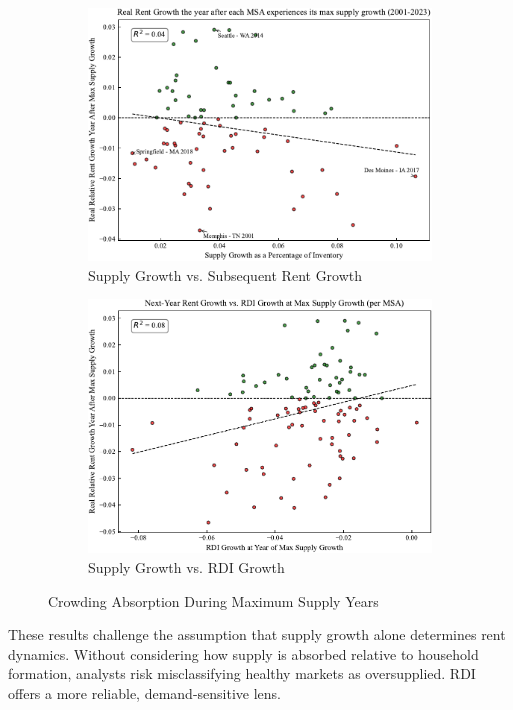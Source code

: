 \documentclass[APA,Times1COL]{WileyNJDv5} %
\begin{document}
\begin{figure}[h]
	\centering
\begin{subfigure}[b]{0.45\textwidth}
	\includegraphics[width=\textwidth]{max_supply_growth_vs_rent_growth.pdf}
	\caption{Supply Growth vs. Subsequent Rent Growth}
	\label{fig:supply-growth-rent}
\end{subfigure}
\hfill
\begin{subfigure}[b]{0.45\textwidth}
	\includegraphics[width=\textwidth]{max_supply_vs_RDI_growth.pdf}
	\caption{Supply Growth vs. RDI Growth}
	\label{fig:supply-growth-rdi}
\end{subfigure}
\caption{Crowding Absorption During Maximum Supply Years}
\label{fig:supply-rent}
\end{figure}
These results challenge the assumption that supply growth alone determines rent dynamics. Without considering how supply is absorbed relative to household formation, analysts risk misclassifying healthy markets as oversupplied. RDI offers a more reliable, demand-sensitive lens.
\end{document}
